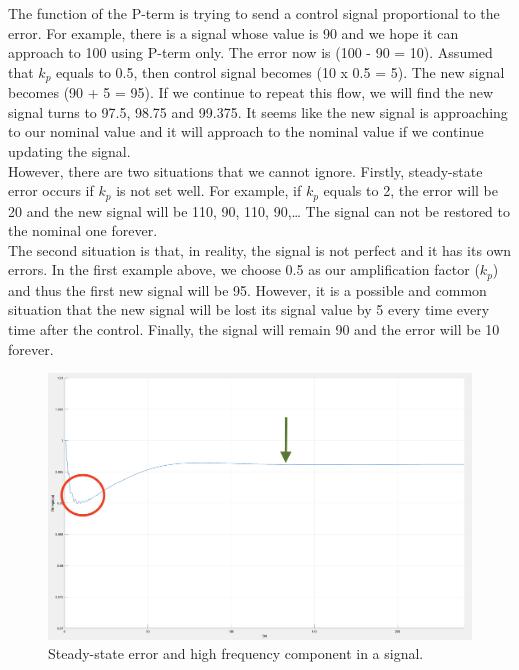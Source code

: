 \documentclass{report}
\begin{document}
 The function of the P-term is trying to send a control signal proportional to the error. For example, there is a signal whose value is 90 and we hope it can approach to 100 using P-term only. The error now is (100 - 90 = 10). Assumed that $k_p$ equals to 0.5, then control signal becomes (10 x 0.5 = 5). The new signal becomes (90 + 5 = 95). If we continue to repeat this flow, we will find the new signal turns to 97.5, 98.75 and 99.375. It seems like the new signal is approaching to our nominal value and it will approach to the nominal value if we continue updating the signal.\\
 

However, there are two situations that we cannot ignore. Firstly, steady-state error occurs if $k_p$ is not set well. For example, if $k_p$ equals to 2, the error will be 20 and the new signal will be 110, 90, 110, 90,… The signal can not be restored to the nominal one forever. \\

The second situation is that, in reality, the signal is not perfect and it has its own errors. In the first example above, we choose 0.5 as our amplification factor ($k_p$) and thus the first new signal will be 95. However, it is a possible and common situation that the new signal will be lost its signal value by 5 every time every time after the control. Finally, the signal will remain 90 and the error will be 10 forever. \\

\begin{figure}[htbp]
\centering
\includegraphics[width = \textwidth]{figure/3_2_steady.png}
\caption{Steady-state error and high frequency component in a signal.}
\label{3_2_steady}
\end{figure}
\end{document}

